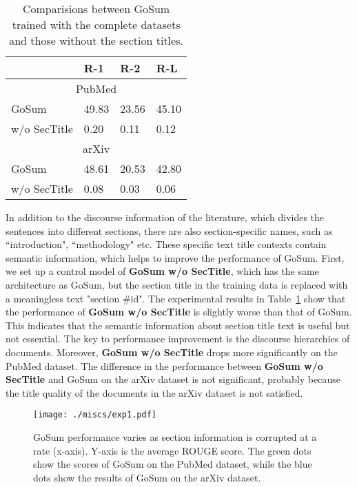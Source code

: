 \documentclass[11pt,a4paper]{article}
\begin{document}
\begin{table}[t]
  \centering
  \begin{tabular}{l|p{13mm}p{13mm}p{13mm}}\toprule
                    & \hfil R-1  & \hfil R-2  & \hfil R-L    \\ \midrule
                    \multicolumn{4}{c}{PubMed}     \\ \midrule
        GoSum                       & \hfil 49.83 & \hfil 23.56 & \hfil 45.10   \\
        \quad w/o SecTitle           & \hfil  0.20 & \hfil  0.11 & \hfil  0.12   \\ \midrule
                    \multicolumn{4}{c}{arXiv}     \\ \midrule
        GoSum                       & \hfil 48.61 & \hfil 20.53 & \hfil 42.80   \\
        \quad w/o SecTitle           & \hfil  0.08 & \hfil  0.03 & \hfil  0.06   \\ \bottomrule
  \end{tabular}
   \caption{Comparisions between GoSum trained with the complete datasets and those without the section titles.} \label{tab:exp2}
\end{table} 
In addition to the discourse information of the literature, which divides the sentences into different sections, there are also section-specific names, such as ``introduction", ``methodology" etc.
These specific text title contexts contain semantic information, which helps to improve the performance of GoSum.
First, we set up a control model of \textbf{GoSum w/o SecTitle}, which has the same architecture as GoSum, but the section title in the training data is replaced with a meaningless text "section \#id".
The experimental results in Table~\ref{tab:exp2} show that the performance of  \textbf{GoSum w/o SecTitle} is slightly worse than that of GoSum. This indicates that the semantic information about section title text is useful but not essential. The key to performance improvement is the discourse hierarchies of documents.
Moreover, \textbf{GoSum w/o SecTitle} drops more significantly on the PubMed dataset. The difference in the performance between \textbf{GoSum w/o SecTitle}  and GoSum on the arXiv dataset is not significant, probably because the title quality of the documents in the arXiv dataset is not satisfied.

\begin{figure}[t]
    \centering
    \texttt{[image: ./miscs/exp1.pdf]} \caption{GoSum performance varies as section information is corrupted at a rate (x-axis). Y-axis is the average ROUGE score. The green dots show the scores of GoSum on the PubMed dataset, while the blue dots show the results of GoSum on the arXiv dataset.}
    \label{fig:exp1}
\end{figure}
 
\end{document}
